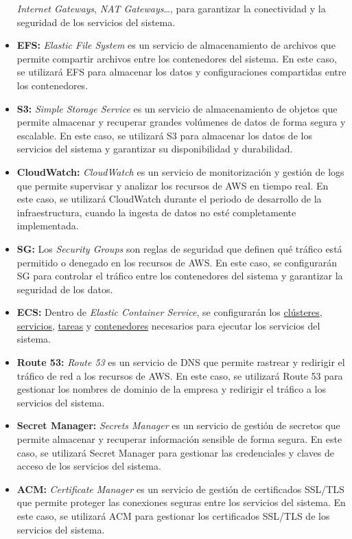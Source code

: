 \begin{itemize}
		\textit{Internet Gateways}, \textit{NAT Gateways}\ldots, para garantizar
		la conectividad y la seguridad de los servicios del sistema.
	\item \textbf{EFS:} \textit{Elastic File System} es un servicio de
		almacenamiento de archivos que permite compartir archivos entre los
		contenedores del sistema. En este caso, se utilizará EFS para almacenar
		los datos y configuraciones compartidas entre los contenedores.
	\item \textbf{S3:} \textit{Simple Storage Service} es un servicio de
		almacenamiento de objetos que permite almacenar y recuperar grandes
		volúmenes de datos de forma segura y escalable. En este caso, se
		utilizará S3 para almacenar los datos de los servicios del sistema y
		garantizar su disponibilidad y durabilidad.
	\item \textbf{CloudWatch:} \textit{CloudWatch} es un servicio de
		monitorización y gestión de logs que permite supervisar y analizar los
		recursos de AWS en tiempo real. En este caso, se utilizará CloudWatch
		durante el periodo de desarrollo de la infraestructura, cuando la
		ingesta de datos no esté completamente implementada.
	\item \textbf{SG:} Los \textit{Security Groups} son reglas de seguridad que
		definen qué tráfico está permitido o denegado en los recursos de AWS.
		En este caso, se configurarán SG para controlar el tráfico entre los
		contenedores del sistema y garantizar la seguridad de los datos.
	\item \textbf{ECS:} Dentro de \textit{Elastic Container Service}, se
		configurarán los \underline{clústeres}, \underline{servicios},
		\underline{tareas} y \underline{contenedores} necesarios para
		ejecutar los servicios del sistema.
	\item \textbf{Route 53:} \textit{Route 53} es un servicio de DNS que permite
		rastrear y redirigir el tráfico de red a los recursos de AWS. En este
		caso, se utilizará Route 53 para gestionar los nombres de dominio de la
		empresa y redirigir el tráfico a los servicios del sistema.
	\item \textbf{Secret Manager:} \textit{Secrets Manager} es un servicio de
		gestión de secretos que permite almacenar y recuperar información
		sensible de forma segura. En este caso, se utilizará Secret Manager para
		gestionar las credenciales y claves de acceso de los servicios del
		sistema.
	\item \textbf{ACM:} \textit{Certificate Manager} es un servicio de gestión
		de certificados SSL/TLS que permite proteger las conexiones seguras
		entre los servicios del sistema. En este caso, se utilizará ACM para
		gestionar los certificados SSL/TLS de los servicios del sistema.
\end{itemize}

